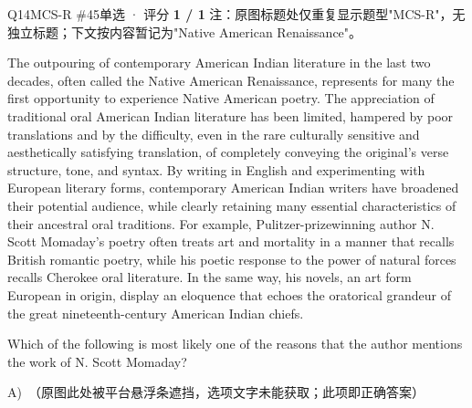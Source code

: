 \begin{qblock}{Q14\quad MCS-R \#45}{单选 · 评分 \textcolor{cAccent}{\bfseries 1 / 1}}
{\footnotesize\color{gray} 注：原图标题处仅重复显示题型"MCS-R"，无独立标题；下文按内容暂记为"Native American Renaissance"。}
\begin{promptbox}
The outpouring of contemporary American Indian literature in the last two decades, often called the Native American Renaissance, represents for many the first opportunity to experience Native American poetry. The appreciation of traditional oral American Indian literature has been limited, hampered by poor translations and by the difficulty, even in the rare culturally sensitive and aesthetically satisfying translation, of completely conveying the original's verse structure, tone, and syntax. By writing in English and experimenting with European literary forms, contemporary American Indian writers have broadened their potential audience, while clearly retaining many essential characteristics of their ancestral oral traditions. For example, Pulitzer-prizewinning author N. Scott Momaday's poetry often treats art and mortality in a manner that recalls British romantic poetry, while his poetic response to the power of natural forces recalls Cherokee oral literature. In the same way, his novels, an art form European in origin, display an eloquence that echoes the oratorical grandeur of the great nineteenth-century American Indian chiefs.
\end{promptbox}
\begin{notebox}Which of the following is most likely one of the reasons that the author mentions the work of N. Scott Momaday?\end{notebox}
{\small
A)\ {\color{gray}（原图此处被平台悬浮条遮挡，选项文字未能获取；此项即正确答案）}\\
}
\end{qblock}

